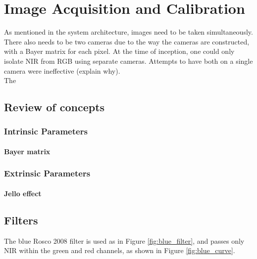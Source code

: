 \chapter{Image Acquisition and Calibration}

As mentioned in the system architecture, images need to be taken simultaneously. There also needs to be two cameras due to the way the cameras are constructed, with a Bayer matrix for each pixel. At the time of inception, one could only isolate NIR from RGB using separate cameras. Attempts to have both on a single camera were ineffective (explain why).\\

\noindent
The

\section{Review of concepts}

\subsection{Intrinsic Parameters}

\subsubsection{Bayer matrix}

\subsection{Extrinsic Parameters}

\subsubsection{Jello effect}

\section{Filters}

The blue Rosco 2008 filter is used as in Figure \ref{fig:blue_filter}, and passes only NIR within the green and red channels, as shown in Figure \ref{fig:blue_curve}.

